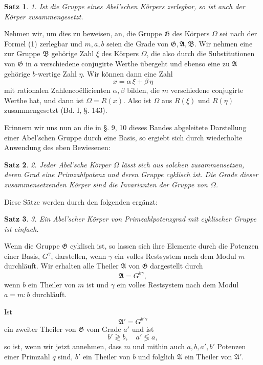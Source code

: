 \documentclass[12pt,a4paper]{article}
\newtheorem*{satz}{Satz}
\begin{document}
\begin{satz}
1. Ist die Gruppe eines Abel'schen Körpers zerlegbar, so ist auch der Körper zusammengesetzt.
\end{satz}

Nehmen wir, um dies zu beweisen, an, die Gruppe $\mathfrak{G}$ des Körpers $\Omega$ sei nach der Formel (1) zerlegbar und $m, a, b$ seien die Grade von $\mathfrak{G}, \mathfrak{A}, \mathfrak{B}$. Wir nehmen eine zur Gruppe $\mathfrak{B}$ gehörige Zahl $\xi$ des Körpers $\Omega$, die also durch die Substitutionen von $\mathfrak{G}$ in $a$ verschiedene conjugirte Werthe übergeht und ebenso eine zu $\mathfrak{A}$ gehörige $b$-wertige Zahl $\eta$. Wir können dann eine Zahl
\[
x = \alpha\,\xi + \beta\,\eta
\]
mit rationalen Zahlencoëfficienten $\alpha, \beta$ bilden, die $m$ verschiedene conjugirte Werthe hat, und dann ist $\Omega = R(x)$. Also ist $\Omega$ aus $R(\xi)$ und $R(\eta)$ zusammengesetzt (Bd. I, \S. 143).

Erinnern wir uns nun an die in \S. 9, 10 dieses Bandes abgeleitete Darstellung einer Abel'schen Gruppe durch eine Basis, so ergiebt sich durch wiederholte Anwendung des eben Bewiesenen:

\begin{satz}
2. Jeder Abel'sche Körper $\Omega$ lässt sich aus solchen zusammensetzen, deren Grad eine Primzahlpotenz und deren Gruppe cyklisch ist. Die Grade dieser zusammensetzenden Körper sind die Invarianten der Gruppe von $\Omega$.
\end{satz}

Diese Sätze werden durch den folgenden ergänzt:

\begin{satz}
3. Ein Abel'scher Körper von Primzahlpotenzgrad mit cyklischer Gruppe ist einfach.
\end{satz}

Wenn die Gruppe $\mathfrak{G}$ cyklisch ist, so lassen sich ihre Elemente durch die Potenzen einer Basis, $G^\gamma$, darstellen, wenn $\gamma$ ein volles Restsystem nach dem Modul $m$ durchläuft. Wir erhalten alle Theiler $\mathfrak{A}$ von $\mathfrak{G}$ dargestellt durch
\[
\mathfrak{A} = G^{b\gamma},
\]
wenn $b$ ein Theiler von $m$ ist und $\gamma$ ein volles Restsystem nach dem Modul $a = m : b$ durchläuft.

Ist
\[
\mathfrak{A}' = G^{b'\gamma}
\]
ein zweiter Theiler von $\mathfrak{G}$ vom Grade $a'$ und ist
\[
b' \gtrless b,\quad a' \lessgtr a,
\]
so ist, wenn wir jetzt annehmen, dass $m$ und mithin auch $a, b, a', b'$ Potenzen einer Primzahl $q$ sind, $b'$ ein Theiler von $b$ und folglich $\mathfrak{A}$ ein Theiler von $\mathfrak{A}'$.
\end{document}
